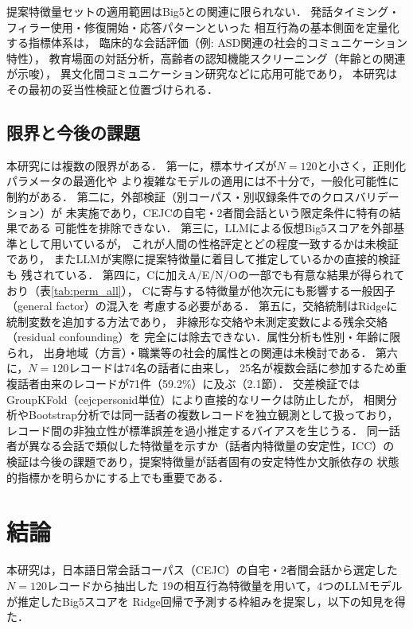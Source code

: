 \documentclass[dvipdfmx,11pt,a4paper]{bxjsarticle}
\renewcommand{\_}{\paperorigunderscore\allowbreak}%
\begin{document}
提案特徴量セットの適用範囲はBig5との関連に限られない．
発話タイミング・フィラー使用・修復開始・応答パターンといった
相互行為の基本側面を定量化する指標体系は，
臨床的な会話評価（例: ASD関連の社会的コミュニケーション特性），
教育場面の対話分析，高齢者の認知機能スクリーニング（年齢との関連が示唆），
異文化間コミュニケーション研究などに応用可能であり，
本研究はその最初の妥当性検証と位置づけられる．

\subsection{限界と今後の課題}

本研究には複数の限界がある．
第一に，標本サイズが$N = 120$と小さく，正則化パラメータの最適化や
より複雑なモデルの適用には不十分で，一般化可能性に制約がある．
第二に，外部検証（別コーパス・別収録条件でのクロスバリデーション）が
未実施であり，CEJCの自宅・2者間会話という限定条件に特有の結果である
可能性を排除できない．
第三に，LLMによる仮想Big5スコアを外部基準として用いているが，
これが人間の性格評定とどの程度一致するかは未検証であり，
またLLMが実際に提案特徴量に着目して推定しているかの直接的検証も
残されている．
第四に，Cに加えA/E/N/Oの一部でも有意な結果が得られており（表\ref{tab:perm_all}），
Cに寄与する特徴量が他次元にも影響する一般因子（general factor）の混入を
考慮する必要がある．
第五に，交絡統制はRidgeに統制変数を追加する方法であり，
非線形な交絡や未測定変数による残余交絡（residual confounding）を
完全には除去できない．属性分析も性別・年齢に限られ，
出身地域（方言）・職業等の社会的属性との関連は未検討である．
第六に，$N = 120$レコードは74名の話者に由来し，
25名が複数会話に参加するため重複話者由来のレコードが71件（59.2\%）に及ぶ（2.1節）．
交差検証ではGroupKFold（cejc\_person\_id単位）により直接的なリークは防止したが，
相関分析やBootstrap分析では同一話者の複数レコードを独立観測として扱っており，
レコード間の非独立性が標準誤差を過小推定するバイアスを生じうる．
同一話者が異なる会話で類似した特徴量を示すか（話者内特徴量の安定性，ICC）の
検証は今後の課題であり，提案特徴量が話者固有の安定特性か文脈依存の
状態的指標かを明らかにする上でも重要である．

\section{結論}

本研究は，日本語日常会話コーパス（CEJC）の自宅・2者間会話から選定した$N = 120$レコードから抽出した
19の相互行為特徴量を用いて，4つのLLMモデルが推定したBig5スコアを
Ridge回帰で予測する枠組みを提案し，以下の知見を得た．
\end{document}
